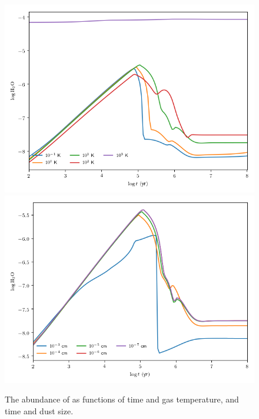 \documentclass[11pt]{article}
\newenvironment{tight_enumerate}{
    \begin{enumerate}[label=(\alph*)]
    \setlength{\itemsep}{3pt}
    \setlength{\parskip}{0pt}}
    {\end{enumerate}}
\begin{document}
\begin{tight_enumerate}
\begin{figure}[H]
\centering
\includegraphics[height=0.45\textheight]{d/t_abundances.png}
\includegraphics[height=0.45\textheight]{d/s_abundances.png}
\caption{The abundance of  as functions of time and gas temperature, and time and dust size.}
\end{figure}
\end{tight_enumerate}
\end{document}
